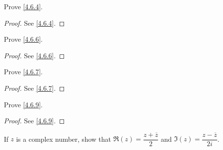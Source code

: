 \exercisesection

\begin{ex}\label{ex:4.6.1}
  Prove \cref{4.6.4}.
\end{ex}

\begin{proof}
  See \cref{4.6.4}.
\end{proof}

\begin{ex}\label{ex:4.6.2}
  Prove \cref{4.6.6}.
\end{ex}

\begin{proof}
  See \cref{4.6.6}.
\end{proof}

\begin{ex}\label{ex:4.6.3}
  Prove \cref{4.6.7}.
\end{ex}

\begin{proof}
  See \cref{4.6.7}.
\end{proof}

\begin{ex}\label{ex:4.6.4}
  Prove \cref{4.6.9}.
\end{ex}

\begin{proof}
  See \cref{4.6.9}.
\end{proof}

\begin{ex}\label{ex:4.6.5}
  If \(z\) is a complex number, show that \(\Re(z) = \dfrac{z + \overline{z}}{2}\) and \(\Im(z) = \dfrac{z - \overline{z}}{2i}\).
\end{ex}

